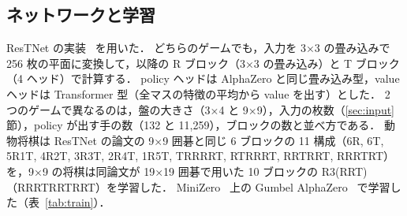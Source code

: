 \documentclass[submit]{ipsj}
\begin{document}
\subsection{ネットワークと学習}
ResTNet の実装~\cite{restnet} を用いた．%
どちらのゲームでも，入力を 3×3 の畳み込みで 256 枚の平面に変換して，以降の R ブロック（3×3 の畳み込み）と T ブロック（4 ヘッド）で計算する．
policy ヘッドは AlphaZero と同じ畳み込み型，value ヘッドは Transformer 型（全マスの特徴の平均から value を出す）とした．
2 つのゲームで異なるのは，盤の大きさ（3×4 と 9×9），入力の枚数（\ref{sec:input}節），policy が出す手の数（132 と 11,259），ブロックの数と並べ方である．
動物将棋は ResTNet の論文の 9×9 囲碁と同じ 6 ブロックの 11 構成（6R, 6T, 5R1T, 4R2T, 3R3T, 2R4T, 1R5T, TRRRRT, RTRRRT, RRTRRT, RRRTRT）を，9×9 の将棋は同論文が 19×19 囲碁で用いた 10 ブロックの R3(RRT)（RRRTRRTRRT）を学習した．
MiniZero~\cite{minizero} 上の Gumbel AlphaZero~\cite{gumbel} で学習した（表~\ref{tab:train}）．
\end{document}
